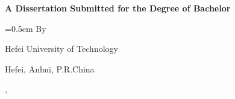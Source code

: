 \begin{titlepage}
    \centering
    \vspace*{-0.2cm}

    {
        \linespread{1.25}
        \sanhao \bfseries{A Dissertation Submitted for the Degree of Bachelor}
        \vspace{3.2cm}
    }

    {
        \linespread{2}
        \xiaoerhao \bfseries{\titleEn}
        \vspace{1cm}
        \par
    }

    {
        \sanhao
        \parskip=0.5em
        \sanhao By

        \studentNameEn
        \vfill

        Hefei University of Technology

        Hefei, Anhui, P.R.China

        \finishedMonthEn, \finishedYear

        \vspace{0.5cm}
    }
\end{titlepage}
